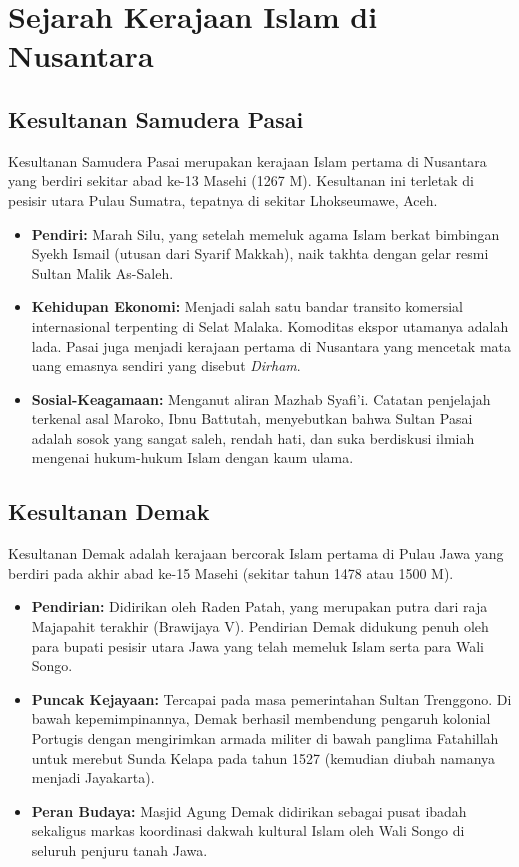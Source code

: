 \documentclass[12pt, a4paper]{article}
\begin{document}
\section{Sejarah Kerajaan Islam di Nusantara}
\subsection{Kesultanan Samudera Pasai}
Kesultanan Samudera Pasai merupakan kerajaan Islam pertama di Nusantara yang berdiri sekitar abad ke-13 Masehi (1267 M). Kesultanan ini terletak di pesisir utara Pulau Sumatra, tepatnya di sekitar Lhokseumawe, Aceh.
\begin{itemize}
	\item \textbf{Pendiri:} Marah Silu, yang setelah memeluk agama Islam berkat bimbingan Syekh Ismail (utusan dari Syarif Makkah), naik takhta dengan gelar resmi Sultan Malik As-Saleh.
	\item \textbf{Kehidupan Ekonomi:} Menjadi salah satu bandar transito komersial internasional terpenting di Selat Malaka. Komoditas ekspor utamanya adalah lada. Pasai juga menjadi kerajaan pertama di Nusantara yang mencetak mata uang emasnya sendiri yang disebut \textit{Dirham}.
	\item \textbf{Sosial-Keagamaan:} Menganut aliran Mazhab Syafi'i. Catatan penjelajah terkenal asal Maroko, Ibnu Battutah, menyebutkan bahwa Sultan Pasai adalah sosok yang sangat saleh, rendah hati, dan suka berdiskusi ilmiah mengenai hukum-hukum Islam dengan kaum ulama.
\end{itemize}

\subsection{Kesultanan Demak}
Kesultanan Demak adalah kerajaan bercorak Islam pertama di Pulau Jawa yang berdiri pada akhir abad ke-15 Masehi (sekitar tahun 1478 atau 1500 M).
\begin{itemize}
	\item \textbf{Pendirian:} Didirikan oleh Raden Patah, yang merupakan putra dari raja Majapahit terakhir (Brawijaya V). Pendirian Demak didukung penuh oleh para bupati pesisir utara Jawa yang telah memeluk Islam serta para Wali Songo.
	\item \textbf{Puncak Kejayaan:} Tercapai pada masa pemerintahan Sultan Trenggono. Di bawah kepemimpinannya, Demak berhasil membendung pengaruh kolonial Portugis dengan mengirimkan armada militer di bawah panglima Fatahillah untuk merebut Sunda Kelapa pada tahun 1527 (kemudian diubah namanya menjadi Jayakarta).
	\item \textbf{Peran Budaya:} Masjid Agung Demak didirikan sebagai pusat ibadah sekaligus markas koordinasi dakwah kultural Islam oleh Wali Songo di seluruh penjuru tanah Jawa.
\end{itemize}
\end{document}

